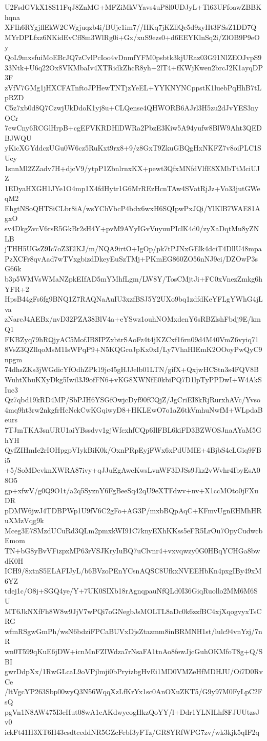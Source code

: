 U2FsdGVkX18S11FqJ8ZnMG+MFZiMkVYavs4uP8l0UDJyL+Tl63UFfoawZBBKhqna
XFIh6RYgjflEkW2CWgjuqzb4i/BUjc1im7//HKq7jKZllQc5d9zyHt3FSsZ1DD7Q
MYrDPLfxz6NKidEvCff8m3WlRg0i+Gx/xuS9ezs0+d6EEYKlnSq2i/ZlOB9P9eOy
QoL9mxsfuiMoEBrJQ7zCvlPcIoo4vDnmfYFM0psbtk3kjURaz03G91NlZEOJvpS9
33Ntk+U6q22Ox8VKMbaIv4XTRidkZhcR8yh+2lT4+fKWjKwen2brcJ2K1ayqDP3F
zVfV7GMg1jHXCFATnftoJPHewTNTjzYeEL+YYKNYNCppstK1luebPqHhB7tLpRZD
C5z7xb0d8Q7CzwjUkDdoK1yj8u+CLQense4QHWORB6AJrl3H5zu2dJvYES3nyOCr
7ewCny6RCGlHrpB+cgEFVKRDHlDWRa2PbzE3Kiw5A94yufw8BlW9Aht3QEDBJWQU
yKicXGYddczUGu0W6cz5RuKxt9rx8+9/z8GxT9ZkuGBQgHxNKFZ7v8oiPLC1SUcy
1snnMl2ZZadv7H+djcV9/ytpP1ZbnlrnxKX+pewt3QfxMNfdVlfE8XMbTtMciUJZ
1EDyaHXGH1JYe1O4mp1X4fdHytr1G6MrREzHcnTAw4SVatRjJz+Vo33jutGWeqM2
EhgtNSoQHTSiCLbr8iA/wsYChVbcP4bdx6wxH6SQIpwPxJQi/YlKlB7WAE81AgxO
sv4DkgZvcV6rsR5GkBr2sH4Y+pvM9AYyIGvVuyuuPIclK4d0/zyXaDqtMu8yZNLB
jTHH5UGsZ9Ic7oZ3ElKJ/m/NQA9irtO+IgOp/pk7tPJNxGElk4dciT4DllU48mpa
PzXCFr8qvAad7wTVxgbizdDkeyEuSzTMj+PKmEG860ZO56nNJ9ci/DZOwP3sG66k
b3p5WMVsWMaNZpkEIfAD5mYMhfLgm/LW8Y/TosCMjtJi+FC0xVnezZmkg6hYFR+2
HpsB44gFs6fg9BNQ1Z7RAQNaAuIU3xzfBSJ5Y2UXo9bq1zdfdKeYFLgYWhG4jLva
zNarcJ4AEBx/nvD32PZA38BlV4a+eYSwz1ouhNOMxdenY6sRBZlshFbdj9E/kmQ1
FKBZyq79hRQjyAC5MofJB8IPZxbtrSAoFz4t4jKZCxf16rn09d4M40VmZ6vyiq71
8VsZ3QZllqoMsM1IsWPqP9+N5KQGroJpKx0xI/Ly7VhaHIEmK2OOoyPwQyC9npgm
74dhsZKs3jWGdicYfOdhZPk19jc45gHJJelb01LTN/gifX+QxjwHCStn3s4FQV8B
WuhtXbuKXyDkg5Iwil3J9ofFN6+vKG8XWNfE0kbiPQ7D1lpTyPPDwI+W4AkSIuc3
Qz7qbd19kRD4MP/SbPJH6YSGfOwjcDyf90fCQjZ/JgCriEI8kRjRurxhAVc/Yvso
4mq9ht3rw2nkgfrHcNckCwKGqiwyD8+HKLEwO7o1aZ6tkVmhuNwfM+WLpdaBeurs
7TJmTKA3snURU1aiYBssdvv1gjWfcxhfCQp6IlFBL6kiFD3BZWOSJnaAYaM5GhYH
QyfZIHmIe2rIOHpgpVIykBiK0k/OxnPRpEyjFWx6xPdUMIE+4BjbS4cLGiq9FBi5
+5/SoMDevknXWRA87ivy+qJJuEgAweKwsLvnWF3DJSs9Jkz2vWvhr4IbyEsA08O5
gp+xfwV/g0Q9O1t/a2q5SyznY6FgBeeSq42qU9eXTFdwv+nv+X1ccMOto0jFXuDR
pDMW6jwJ4TDBPWp1U9fV6C2gFo+AG3P/mxbBQpAqC+KFmvUgnEHMhHRuXMzVqg9k
Mceg3E7SMzdUCuRd3QLm2pmxkWI91C7knyEXhKKss5eFR5LrOu7OpyCudwcbEmom
TN+bG8yBvVFizpxMP63rVSJKryIuBQ7uClvnr4+vxvqwzy0G0HBqYCHGa8bwdK0H
ICH9/8xtnS5ELAFIJyL/b6BVzoPEnYCsnAQSC8UfkxNVEEHbKn4pxgIBy49xM6YZ
tdej1c/O8j+SGQ4ye/Y+7UK0SIXb18rAgnqpauNfQLd0I36GiqRuollo2MM6M6SU
MT6JkNXfFh8W8w9JjV7wPQi7oGNegbJsMOLTL8aDc0k6zzfBC4xjXqogvyxTsCRG
wfmRSgwGmPh/wsN6bdziFPCaBUVxDjsZtazmm8inBRMNH1st/lulc94vnYzj/7nR
wn0T599qKuE6jDW+icnMnFZIWdza7rNsaFA1tnAo8fewJjcGuhOKMfoT8g+Q/SBI
gwrDdpXx/1RwGLcaL9oVPjlmji0bPryizbgHvEi1MD0VMZeHfMDHJU/Oi7D0RvCe
/ltVgcYP263Sbp00wyQ3N56WqqXzLfKrYx1sc0AnOXuZKT5/G9y97M0FyLpC2FsQ
pgVn1N8AW475I3eHut08wA1eAKdwyeogHkzQoYY/l+Ddr1YLNILhf8FJUUtzsJv0
ickFt41H3XT6H43csdtceddNR5GZcFebI3yFTz/GR8YRfWPG7zv/wk3kjk5qIF2q
